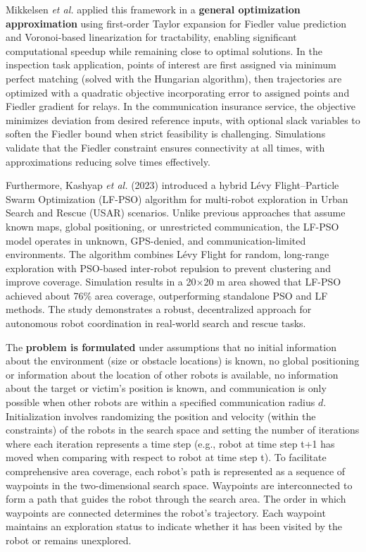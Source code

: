 Mikkelsen \textit{et al.} applied this framework in a \textbf{general optimization approximation} using first-order Taylor expansion for Fiedler value prediction and Voronoi-based linearization for tractability, enabling significant computational speedup while remaining close to optimal solutions. In the inspection task application, points of interest are first assigned via minimum perfect matching (solved with the Hungarian algorithm), then trajectories are optimized with a quadratic objective incorporating error to assigned points and Fiedler gradient for relays. In the communication insurance service, the objective minimizes deviation from desired reference inputs, with optional slack variables to soften the Fiedler bound when strict feasibility is challenging. Simulations validate that the Fiedler constraint ensures connectivity at all times, with approximations reducing solve times effectively.

Furthermore, Kashyap \textit{et al.} (2023) \cite{kashyap2025simulations} introduced a hybrid Lévy Flight–Particle Swarm Optimization (LF-PSO) algorithm for multi-robot exploration in Urban Search and Rescue (USAR) scenarios. Unlike previous approaches that assume known maps, global positioning, or unrestricted communication, the LF-PSO model operates in unknown, GPS-denied, and communication-limited environments. The algorithm combines Lévy Flight for random, long-range exploration with PSO-based inter-robot repulsion to prevent clustering and improve coverage. Simulation results in a 20×20 m area showed that LF-PSO achieved about 76\% area coverage, outperforming standalone PSO and LF methods. The study demonstrates a robust, decentralized approach for autonomous robot coordination in real-world search and rescue tasks.

The \textbf{problem is formulated} under assumptions that no initial information about the environment (size or obstacle locations) is known, no global positioning or information about the location of other robots is available, no information about the target or victim’s position is known, and communication is only possible when other robots are within a specified communication radius $d$. Initialization involves randomizing the position and velocity (within the constraints) of the robots in the search space and setting the number of iterations where each iteration represents a time step (e.g., robot at time step t+1 has moved when comparing with respect to robot at time step t). To facilitate comprehensive area coverage, each robot’s path is represented as a sequence of waypoints in the two-dimensional search space. Waypoints are interconnected to form a path that guides the robot through the search area. The order in which waypoints are connected determines the robot’s trajectory. Each waypoint maintains an exploration status to indicate whether it has been visited by the robot or remains unexplored.

